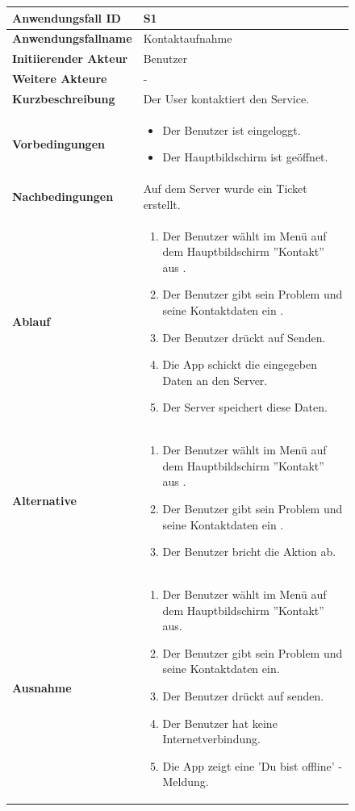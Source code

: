 \begin{figure}[h]
	\centering
	\begin{tabularx}{\textwidth}{ X | X }
		\textbf{Anwendungsfall ID} & S1 \\ \hline
		\textbf{Anwendungsfallname} & Kontaktaufnahme \\ \hline
		\textbf{Initiierender Akteur} & Benutzer \\ \hline
		\textbf{Weitere Akteure} & - \\ \hline
		\textbf{Kurzbeschreibung} & Der User kontaktiert den Service. \\ \hline
		\textbf{Vorbedingungen} &
		\begin {itemize}
			\item Der Benutzer ist eingeloggt.
			\item Der Hauptbildschirm ist geöffnet.
		\end{itemize}\\ \hline
		\textbf{Nachbedingungen} & Auf dem Server wurde ein Ticket erstellt. \\ \hline
		\textbf{Ablauf} &
		\begin{enumerate}
			\item Der Benutzer wählt im Menü auf dem Hauptbildschirm ''Kontakt'' aus .
			\item Der Benutzer gibt sein Problem und seine Kontaktdaten ein .
			\item Der Benutzer drückt auf Senden.
			\item Die App schickt die eingegeben Daten an den Server. 
			\item Der Server speichert diese Daten.
		\end{enumerate} \\ \hline
		\textbf{Alternative} &
		\begin{enumerate}
			\item Der Benutzer wählt im Menü auf dem Hauptbildschirm ''Kontakt'' aus .
			\item Der Benutzer gibt sein Problem und seine Kontaktdaten ein .
			\item Der Benutzer bricht die Aktion ab.
		\end{enumerate}  \\ \hline
		\textbf{Ausnahme} &
		\begin{enumerate}
			\item Der Benutzer wählt im Menü auf dem Hauptbildschirm ''Kontakt'' aus.
			\item Der Benutzer gibt sein Problem und seine Kontaktdaten ein.
			\item Der Benutzer drückt auf senden.
			\item Der Benutzer hat keine Internetverbindung.
			\item Die App zeigt eine 'Du bist offline' -Meldung.
		\end{enumerate} 
	\end{tabularx}
\end{figure}

